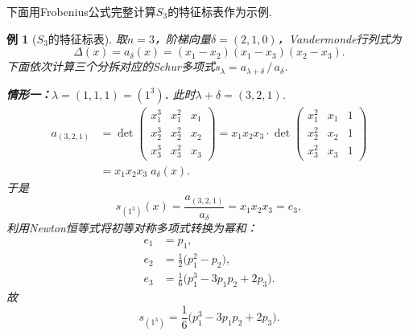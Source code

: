 \documentclass{sjtureport}
\newtheorem{example}{例}[chapter]
\begin{document}
下面用Frobenius公式完整计算$S_3$的特征标表作为示例.
\begin{example}[$S_3$的特征标表]\label{ex:S3}
取$n=3$，阶梯向量$\delta=(2,1,0)$，Vandermonde行列式为
\begin{equation}\label{eq:S3-vander}
    \Delta(x)=a_\delta(x)=(x_1-x_2)(x_1-x_3)(x_2-x_3).
\end{equation}
下面依次计算三个分拆对应的Schur多项式$s_\lambda=a_{\lambda+\delta}\,/\,a_\delta$. 

\medskip
\noindent\textbf{情形一：$\lambda=(1,1,1)=(1^3)$. }\quad
此时$\lambda+\delta=(3,2,1)$. 
\begin{align*}
    a_{(3,2,1)}&= \det\begin{pmatrix}
        x_1^3 & x_1^2 & x_1\\
        x_2^3 & x_2^2 & x_2\\
        x_3^3 & x_3^2 & x_3
    \end{pmatrix}
    =x_1x_2x_3\cdot\det\begin{pmatrix}
        x_1^2 & x_1 & 1\\
        x_2^2 & x_2 & 1\\
        x_3^2 & x_3 & 1
    \end{pmatrix} \\
    &=x_1x_2x_3\;a_\delta(x).
\end{align*}
于是
\begin{equation}\label{eq:S3-s111}
    s_{(1^3)}(x)=\frac{a_{(3,2,1)}}{a_\delta}=x_1x_2x_3=e_3,
\end{equation}
利用Newton恒等式将初等对称多项式转换为幂和：
\begin{align*}
    e_1&=p_1,\\
    e_2&=\frac{1}{2}\bigl(p_1^2-p_2\bigr),\\
    e_3&=\frac{1}{6}\bigl(p_1^3-3p_1p_2+2p_3\bigr).
\end{align*}
故
\begin{equation}\label{eq:S3-s111-ps}
    s_{(1^3)}=\frac{1}{6}\bigl(p_1^3-3p_1p_2+2p_3\bigr).
\end{equation}


\end{example}
\end{document}
